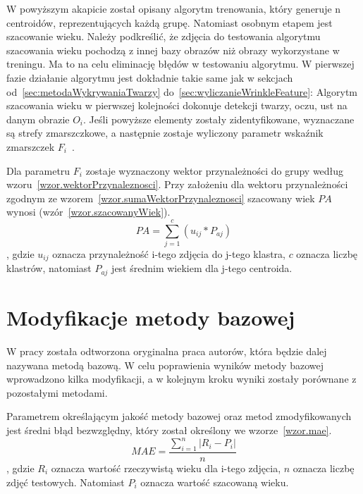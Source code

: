 \documentclass[a4paper,twoside,12pt]{book}
\begin{document}
    W powyższym akapicie został opisany algorytm trenowania, który generuje n centroidów, reprezentujących każdą
    grupę. Natomiast osobnym etapem jest szacowanie wieku. Należy podkreślić, że zdjęcia do testowania algorytmu szacowania wieku
    pochodzą z innej bazy obrazów niż obrazy wykorzystane w treningu. Ma to na celu eliminację błędów w testowaniu algorytmu.
    W pierwszej fazie działanie algorytmu jest dokładnie takie same jak w sekcjach od~\ref{sec:metodaWykrywaniaTwarzy}
    do~\ref{sec:wyliczanieWrinkleFeature}:
    Algorytm szacowania wieku w pierwszej kolejności dokonuje detekcji twarzy, oczu, ust na danym obrazie $O_{i}$.
    Jeśli powyższe elementy zostały zidentyfikowane, wyznaczane są strefy zmarszczkowe,
    a następnie zostaje wyliczony parametr wskaźnik zmarszczek $F_{i}$~\cite{wrinkleFeatures}.

    Dla parametru $F_{i}$ zostaje wyznaczony wektor przynależności do grupy
    według wzoru~\ref{wzor.wektorPrzynaleznosci}.
    Przy założeniu dla wektoru przynależności zgodnym ze wzorem~\ref{wzor.sumaWektorPrzynaleznosci} szacowany wiek
    $PA$
    wynosi
    (wzór~\ref{wzor.szacowanyWiek}).
    \large
    \begin{equation}
        PA=\sum_{j=1}^{c}(u_{ij}*P_{aj})
        \label{wzor.szacowanyWiek}
    \end{equation}
    \normalsize
    , gdzie $u_{ij}$ oznacza przynależność i-tego zdjęcia do j-tego klastra, $c$ oznacza liczbę klastrów,
    natomiast $P_{aj}$ jest średnim wiekiem dla j-tego centroida.

    \chapter{Modyfikacje metody bazowej}\label{ch:modyfikacje-metody-bazowej}
    W pracy została odtworzona oryginalna praca autorów, która
    będzie dalej nazywana metodą bazową.
    W celu poprawienia wyników metody bazowej wprowadzono kilka modyfikacji, a
    w kolejnym kroku wyniki zostały porównane z pozostałymi metodami.

    Parametrem określającym jakość metody bazowej oraz metod zmodyfikowanych jest średni błąd bezwzględny,
    który został określony we wzorze~\ref{wzor.mae}.
    \large
    \begin{equation}
        MAE = \frac{\sum_{i=1}^{n}\left | R_{i}-P_{i} \right |}{n}
        \label{wzor.mae}
    \end{equation}
    \normalsize
    , gdzie $R_{i}$ oznacza wartość rzeczywistą wieku dla i-tego zdjęcia, $n$ oznacza liczbę zdjęć testowych.
    Natomiast $P_{i}$ oznacza wartość szacowaną wieku.
\end{document}
